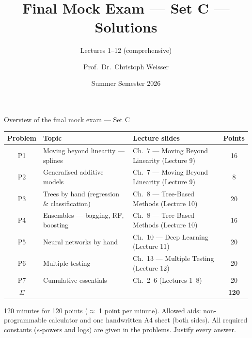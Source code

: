 \documentclass[aspectratio=169,11pt]{beamer}
\title{Final Mock Exam --- Set C --- Solutions}
\subtitle{Lectures 1--12 (comprehensive)}
\author{Prof.\ Dr.\ Christoph Weisser}\institute{Quantitative Research Methods \textperiodcentered\ HSBI}
\date{Summer Semester 2026}\graphicspath{{images/}}
\begin{document}
\begin{frame}[plain]\titlepage\end{frame}

\begin{frame}{Overview of the final mock exam --- Set C}
  \scriptsize
  \begin{center}
  \begin{tabular}{@{}cllc@{}}
    \toprule
    \textbf{Problem} & \textbf{Topic} & \textbf{Lecture slides} & \textbf{Points}\\
    \midrule
    P1 & Moving beyond linearity --- splines & Ch.\ 7 --- Moving Beyond Linearity (Lecture 9) & 16\\
    P2 & Generalised additive models & Ch.\ 7 --- Moving Beyond Linearity (Lecture 9) & 8\\
    P3 & Trees by hand (regression \& classification) & Ch.\ 8 --- Tree-Based Methods (Lecture 10) & 20\\
    P4 & Ensembles --- bagging, RF, boosting & Ch.\ 8 --- Tree-Based Methods (Lecture 10) & 16\\
    P5 & Neural networks by hand & Ch.\ 10 --- Deep Learning (Lecture 11) & 20\\
    P6 & Multiple testing & Ch.\ 13 --- Multiple Testing (Lecture 12) & 20\\
    P7 & Cumulative essentials & Ch.\ 2--6 (Lectures 1--8) & 20\\
    \midrule
    $\Sigma$ & & & \textbf{120}\\
    \bottomrule
  \end{tabular}
  \end{center}
  \vspace{2pt}
  \begin{takeaway}
    120 minutes for 120 points ($\approx$ 1 point per minute). Allowed aids: non-programmable
    calculator and one handwritten A4 sheet (both sides). All required constants ($e$-powers
    and logs) are given in the problems. Justify every answer.
  \end{takeaway}
\end{frame}
\end{document}
